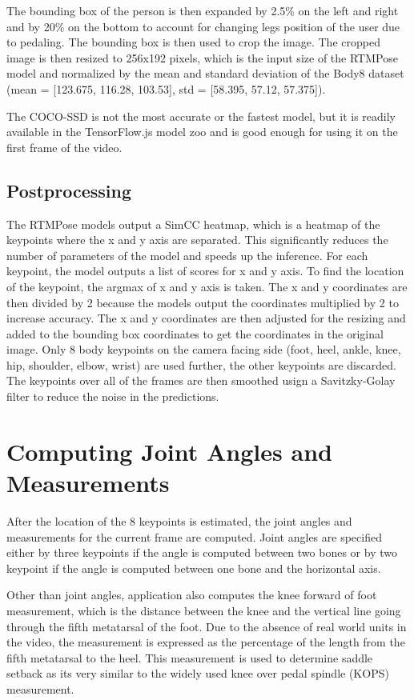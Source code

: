 The bounding box of the person is then expanded by 2.5\% on the left and right and by 20\% on the bottom to account for changing legs position of the user due to pedaling. The bounding box is then used to crop the image. The cropped image is then resized to 256x192 pixels, which is the input size of the RTMPose model and normalized by the mean and standard deviation of the Body8 dataset (mean = [123.675, 116.28, 103.53], std = [58.395, 57.12, 57.375]).

The COCO-SSD is not the most accurate or the fastest model, but it is readily available in the TensorFlow.js model zoo and is good enough for using it on the first frame of the video.

\subsection{Postprocessing}
The RTMPose models output a SimCC \cite{simcc} heatmap, which is a heatmap of the keypoints where the x and y axis are separated. This significantly reduces the number of parameters of the model and speeds up the inference. For each keypoint, the model outputs a list of scores for x and y axis. To find the location of the keypoint, the argmax of x and y axis is taken. The x and y coordinates are then divided by 2 because the models output the coordinates multiplied by 2 to increase accuracy. The x and y coordinates are then adjusted for the resizing and added to the bounding box coordinates to get the coordinates in the original image. Only 8 body keypoints on the camera facing side (foot, heel, ankle, knee, hip, shoulder, elbow, wrist) are used further, the other keypoints are discarded. The keypoints over all of the frames are then smoothed usign a Savitzky-Golay filter \cite{savgol} to reduce the noise in the predictions.

\section{Computing Joint Angles and Measurements}
\label{computing_joint_angles}

After the location of the 8 keypoints is estimated, the joint angles and measurements for the current frame are computed. Joint angles are specified either by three keypoints if the angle is computed between two bones or by two keypoint if the angle is computed between one bone and the horizontal axis.

Other than joint angles, application also computes the knee forward of foot measurement, which is the distance between the knee and the vertical line going through the fifth metatarsal of the foot. Due to the absence of real world units in the video, the measurement is expressed as the percentage of the length from the fifth metatarsal to the heel. This measurement is used to determine saddle setback as its very similar to the widely used knee over pedal spindle (KOPS) measurement.

